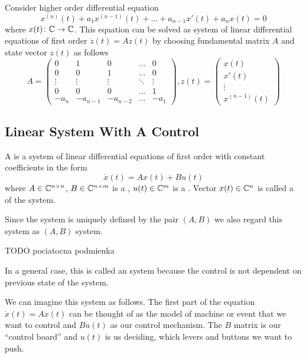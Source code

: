 \begin{example}
	Consider higher order differential equation $$x^{(n)}(t)+a_1x^{(n-1)}(t)+\ldots+a_{n-1}x'(t)+a_nx(t)=0$$ where $x(t)\colon\mathbb{C}\rightarrow\mathbb{C}$. This equation can be solved as system of linear differential equations of first order $\dot{z}(t)=Az(t)$ by choosing fundamental matrix $A$ and state vector $z(t)$ as follows
	\begin{equation*}
		A=
		\begin{pmatrix}
			0 & 1 & 0 & \ldots & 0 \\
			0 & 0 & 1 & \ldots & 0 \\
			\vdots & \vdots & \vdots & \ddots & \vdots \\
			0 & 0 & 0 & \ldots & 1 \\
			-a_n & -a_{n-1} & -a_{n-2} & \ldots & -a_1
		\end{pmatrix}
		, z(t)=
		\begin{pmatrix}
			x(t) \\
			x'(t) \\
			\vdots \\
			x^{(n-1)}(t)
		\end{pmatrix}
	\end{equation*}
\end{example}

\subsection{Linear System With A Control}

\begin{definition}
	A  is a system of linear differential equations of first order with constant coefficients in the form $$\dot{x}(t)=Ax(t)+Bu(t)$$ where $A\in\mathbb{C}^{n\times n}$, $B\in\mathbb{C}^{n\times m}$ is a , $u(t)\in\mathbb{C}^m$ is a . Vector $x(t)\in\mathbb{C}^n$ is called a  of the system.

	Since the system is uniquely defined by the pair $(A,B)$ we also regard this system as $(A,B)$ system.

	TODO pociatocna podmienka
\end{definition}

In a general case, this is called an  system because the control is not dependent on previous state of the system.

We can imagine this system as follows. The first part of the equation $\dot{x}(t)=Ax(t)$ can be thought of as the model of machine or event that we want to control and $Bu(t)$ as our control mechanism. The $B$ matrix is our ``control board'' and $u(t)$ is us deciding, which levers and buttons we want to push. 

